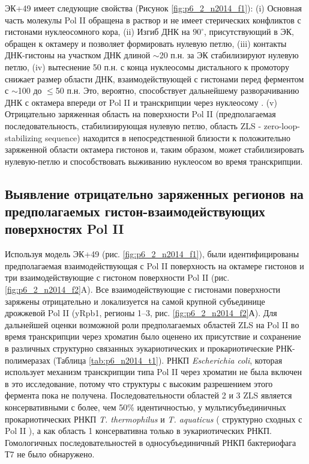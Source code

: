     ЭК+49 имеет следующие свойства (Рисунок \ref{fig:p6_2_n2014_f1}): (i) Основная часть молекулы Pol II обращена в раствор и не имеет стерических конфликтов с гистонами нуклеосомного кора, (ii) Изгиб ДНК на $90^{\circ}$, присутствующий в ЭК, обращен к октамеру и позволяет формировать нулевую петлю, (iii) контакты ДНК-гистоны на участком ДНК длиной $\sim$20 п.н. за ЭК стабилизируют нулевую петлю, (iv) вытеснение 50 п.н. с конца нуклеосомы дистального к промотору снижает размер области ДНК, взаимодействующей с гистонами перед ферментом с $\sim$100 до $\leq$50 п.н. Это, вероятно, способствует дальнейшему разворачиванию ДНК с октамера впереди от Pol II и транскрипции через нуклеосому \cite{kulaeva_mechanism_2009}. (v) Отрицательно заряженная область на поверхности Pol II (предполагаемая последовательность, стабилизирующая нулевую петлю, область ZLS - zero-loop-stabilizing sequence) находится в непосредственной близости к положительно заряженной области октамера гистонов и, таким образом, может стабилизировать нулевую-петлю и способствовать выживанию нуклеосом во время транскрипции.
    
\subsection{Выявление отрицательно заряженных регионов на предполагаемых
гистон-взаимодействующих поверхностях Pol II}
    
    Используя модель ЭК+49 (рис. \ref{fig:p6_2_n2014_f1}), были идентифицированы предполагаемая взаимодействующая с Pol II поверхность на октамере гистонов и три взаимодействующие с гистоном поверхности Pol II (рис. \ref{fig:p6_2_n2014_f2}A). Все взаимодействующие с гистонами поверхности заряжены отрицательно и локализуется на самой крупной субъединице дрожжевой Pol II (yRpb1, регионы 1–3, рис. \ref{fig:p6_2_n2014_f2}А). Для дальнейшей оценки возможной роли предполагаемых областей ZLS на Pol II во время транскрипции через хроматин было оценено их присутствие и сохранение в различных структурно связанных эукариотических и прокариотические РНК-полимеразах  (Таблица \ref{tab:p6_n2014_t1}). РНКП \textit{Escherichia coli}, которая использует механизм транскрипции типа Pol II через хроматин \cite{walter_bacterial_2003} не была включен в это исследование, потому что структуры с высоким разрешением этого фермента пока не получена. Последовательности областей 2 и 3 ZLS является консервативными с более, чем 50\% идентичностью, у мультисубъединичных прокариотических РНКП \textit{T. thermophilus} и \textit{T. aquaticus} ( структурно сходных с Pol II \cite{vassylyev_structural_2007,zhang_crystal_1999}), а как область 1 консервативна только в эукариотических РНКП. Гомологичных последовательностей в односубъединичный РНКП бактериофага Т7 не было обнаружено.
    

